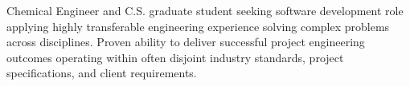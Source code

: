 %
%
%
%
%
{%
Chemical Engineer and C.S. graduate student seeking software development role applying highly transferable engineering experience solving complex problems across disciplines.
}%
%
%
%
\statementSpace
%
%
%
%
{%
Proven ability to deliver successful project engineering outcomes operating within often disjoint industry standards, project specifications, and client requirements. 
}%
%
%
%
%
%
%
%
